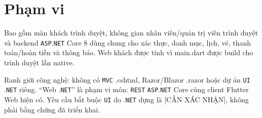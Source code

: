 \clearpage
\section{Phạm vi}\label{sec:srs-3}
Bao gồm màn khách trình duyệt, không gian nhân viên/\allowbreak{}quản trị viên trình duyệt và backend \texttt{ASP}.\texttt{NET} Core 8 dùng chung cho xác thực, danh mục, lịch, vé, thanh toán/\allowbreak{}hoàn tiền và thông báo. Web khách được tính vì main.dart được build cho trình duyệt lẫn native.

Ranh giới công nghệ: không có \texttt{MVC} .cshtml, Razor/\allowbreak{}Blazor .razor hoặc dự án \texttt{UI} .\texttt{NET} riêng. “Web .\texttt{NET}” là phạm vi môn: \texttt{REST} \texttt{ASP}.\texttt{NET} Core cùng client Flutter Web hiện có. Yêu cầu bắt buộc \texttt{UI} do .\texttt{NET} dựng là [CẦN XÁC NHẬN], không phải bằng chứng đã triển khai.
